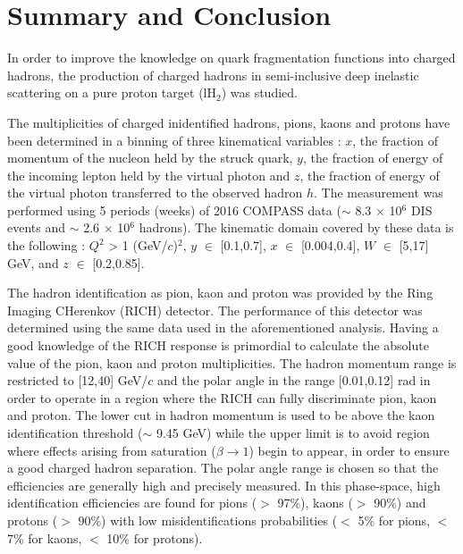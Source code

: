 
\chapter{Summary and Conclusion} %

\label{ch:CCL} %


In order to improve the knowledge on quark fragmentation functions into charged hadrons, the production of charged hadrons in semi-inclusive deep inelastic scattering on a pure proton target (lH$_2$) was studied.

The multiplicities of charged inidentified hadrons, pions, kaons and protons have been determined in a binning of three kinematical variables : $x$, the fraction of momentum of the nucleon held by the struck quark, $y$, the fraction of energy of the incoming lepton held by the virtual photon and $z$, the fraction of energy of the virtual photon transferred to the observed hadron $h$. The measurement was performed using 5 periods (weeks) of 2016 COMPASS data ($\sim$ 8.3 $\times$ 10$^6$ DIS events and $\sim$ 2.6 $\times$ 10$^6$ hadrons). The kinematic domain covered by these data is the following : $Q^2$ > 1 (GeV/$c$)$^2$, $y$ $\in$ [0.1,0.7], $x$ $\in$ [0.004,0.4], $W$ $\in$ [5,17] GeV, and $z$ $\in$ [0.2,0.85].

The hadron identification as pion, kaon and proton was provided by the Ring Imaging CHerenkov (RICH) detector. The performance of this detector was determined using the same data used in the aforementioned analysis. Having a good knowledge of the RICH response is primordial to calculate the absolute value of the pion, kaon and proton multiplicities. The hadron momentum range is restricted to [12,40] GeV/$c$ and the polar angle in the range [0.01,0.12] rad in order to operate in a region where the RICH can fully discriminate pion, kaon and proton. The lower cut in hadron momentum is used to be above the kaon identification threshold ($\sim$ 9.45 GeV) while the upper limit is to avoid region where effects arising from saturation ($\beta \rightarrow 1$) begin to appear, in order to ensure a good charged hadron separation. The polar angle range is chosen so that the efficiencies are generally high and precisely measured. In this phase-space, high identification efficiencies are found for pions ($>$ 97\%), kaons ($>$ 90\%) and protons ($>$ 90\%) with low misidentifications probabilities ($<$ 5\% for pions, $<$ 7\% for kaons, $<$ 10\% for protons).

